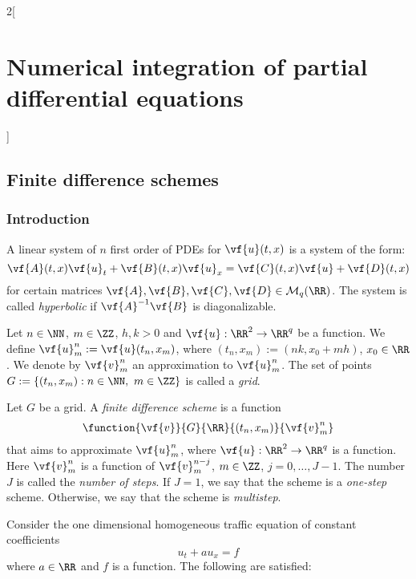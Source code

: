 \documentclass[../../../main_math.tex]{subfiles}
\begin{document}
\begin{multicols}{2}[\section{Numerical integration of partial differential equations}]
  \subsection{Finite difference schemes}
  \subsubsection{Introduction}
  \begin{definition}
    A linear system of $n$ first order of PDEs for $\vf{u}(t,x)$ is a system of the form: $$\vf{A}(t,x)\vf{u}_t+\vf{B}(t,x)\vf{u}_x=\vf{C}(t,x)\vf{u}+\vf{D}(t,x)$$
    for certain matrices $\vf{A},\vf{B},\vf{C}, \vf{D}\in \mathcal{M}_q(\RR)$. The system is called \emph{hyperbolic} if $\vf{A}^{-1}\vf{B}$ is diagonalizable.
  \end{definition}
  \begin{definition}
    Let $n\in\NN$, $m\in\ZZ$, $h,k>0$ and $\vf{u}:\RR^2\rightarrow\RR^q$ be a function. We define $\vf{u}_m^n:=\vf{u}(t_n,x_m)$, where $(t_n, x_m):=(nk,x_0+mh)$, $x_0\in\RR$. We denote by $\vf{v}_m^n$ an approximation to $\vf{u}_m^n$. The set of points $G:=\{(t_n,x_m):n\in\NN,\ m\in\ZZ\}$ is called a \emph{grid}.
  \end{definition}
  \begin{definition}
    Let $G$ be a grid. A \emph{finite difference scheme} is a function $$\function{\vf{v}}{G}{\RR}{(t_n,x_m)}{\vf{v}_m^n}$$
    that aims to approximate $\vf{u}_m^n$, where $\vf{u}:\RR^2\rightarrow\RR^q$ is a function. Here $\vf{v}_m^n$ is a function of $\vf{v}_m^{n-j}$, $m\in\ZZ$, $j=0,\ldots,J-1$. The number $J$ is called the \emph{number of steps}. If $J=1$, we say that the scheme is a \emph{one-step} scheme. Otherwise, we say that the scheme is \emph{multistep}.
  \end{definition}
  \begin{proposition}
    Consider the one dimensional homogeneous traffic equation of constant coefficients
    \begin{equation}\label{NIPDE:traffic}
      u_t+au_x=f
    \end{equation}
    where $a\in\RR$ and $f$ is a function.
    The following are satisfied:
    \begin{enumerate}

\end{enumerate}
\end{proposition}
\end{multicols}
\end{document}
